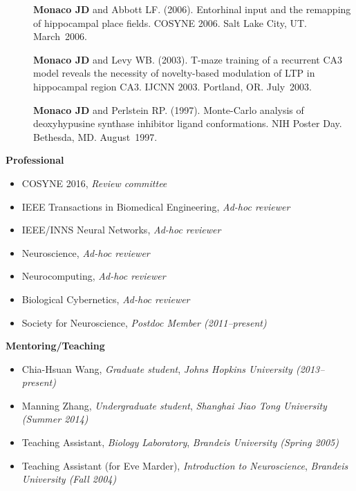 \documentclass[10pt]{article}
\begin{document}
\begin{description}
\item[\quad] \textbf{Monaco JD} and Abbott LF. (2006). Entorhinal input and the remapping of hippocampal place fields. COSYNE 2006. Salt Lake City, UT. March~2006.
\item[\quad] \textbf{Monaco JD} and Levy WB. (2003). T-maze training of a recurrent CA3 model reveals the necessity of novelty-based modulation of LTP in hippocampal region CA3. IJCNN 2003. Portland, OR. July~2003.
\item[\quad] \textbf{Monaco JD} and Perlstein RP. (1997). Monte-Carlo analysis of deoxyhypusine synthase inhibitor ligand conformations. NIH Poster Day. Bethesda, MD. August~1997. 
\end{description}

{\large \textbf{Professional}}
\begin{itemize}
  \item COSYNE 2016, \emph{Review committee}
  \item IEEE Transactions in Biomedical Engineering, \emph{Ad-hoc reviewer}
  \item IEEE/INNS Neural Networks, \emph{Ad-hoc reviewer}
  \item Neuroscience, \emph{Ad-hoc reviewer}
  \item Neurocomputing, \emph{Ad-hoc reviewer}
  \item Biological Cybernetics, \emph{Ad-hoc reviewer}
  \item Society for Neuroscience, \emph{Postdoc Member (2011--present)}
\end{itemize}
  
{\large \textbf{Mentoring/Teaching}}
\begin{itemize}
  \item Chia-Hsuan Wang, \emph{Graduate student}, \emph{Johns Hopkins University (2013--present)}
  \item Manning Zhang, \emph{Undergraduate student}, \emph{Shanghai Jiao Tong University (Summer 2014)}
  \item Teaching Assistant, \emph{Biology Laboratory}, \emph{Brandeis University (Spring 2005)}
  \item Teaching Assistant (for Eve Marder), \emph{Introduction to Neuroscience}, \emph{Brandeis University (Fall 2004)}
\end{itemize}

\end{document}

